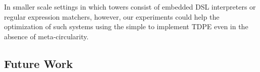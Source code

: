 \documentclass[a4paper,12pt,twoside,openright]{report}
\theoremstyle{definition}
\begin{document}


In smaller scale settings in which towers consist of embedded DSL interpreters or regular expression matchers, however, our experiments could help the optimization of such systems using the simple to implement TDPE even in the absence of meta-circularity.

\subsection{Future Work}\label{subsec:future}
\end{document}
